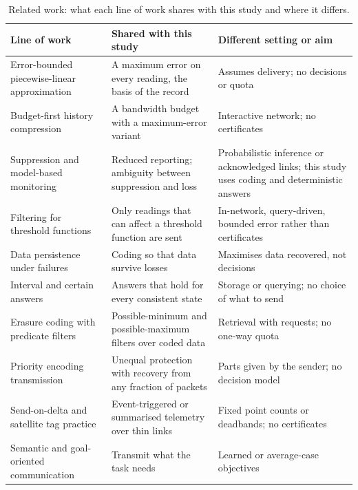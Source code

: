 \begin{table}[t]
\centering
\caption{Related work: what each line of work shares with this study and where it differs.}
\label{tab:novelty}
\scriptsize
\begin{tabularx}{\textwidth}{@{}>{\raggedright\arraybackslash}p{3.4cm}>{\raggedright\arraybackslash}X>{\raggedright\arraybackslash}X@{}}
\toprule
Line of work & Shared with this study & Different setting or aim \\
\midrule
Error-bounded piecewise-linear approximation \citep{imai1988,orourke1981,elmeleegy2009swing,lin2025} & A maximum error on every reading, the basis of the record & Assumes delivery; no decisions or quota \\
Budget-first history compression \citep{deligiannakis2007} & A bandwidth budget with a maximum-error variant & Interactive network; no certificates \\
Suppression and model-based monitoring \citep{silberstein2006conch,silberstein2007baysail,tulone2006paq,deshpande2004model} & Reduced reporting; ambiguity between suppression and loss & Probabilistic inference or acknowledged links; this study uses coding and deterministic answers \\
Filtering for threshold functions \citep{riva2014filtering} & Only readings that can affect a threshold function are sent & In-network, query-driven, bounded error rather than certificates \\
Data persistence under failures \citep{kamra2006growth} & Coding so that data survive losses & Maximises data recovered, not decisions \\
Interval and certain answers \citep{imielinski1984,cheng2003probabilistic,cheng2003managing,brito2017platodb,lin2019plato} & Answers that hold for every consistent state & Storage or querying; no choice of what to send \\
Erasure coding with predicate filters \citep{taurone2024treat} & Possible-minimum and possible-maximum filters over coded data & Retrieval with requests; no one-way quota \\
Priority encoding transmission \citep{albanese1996,boucheron2000pet} & Unequal protection with recovery from any fraction of packets & Parts given by the sender; no decision model \\
Send-on-delta and satellite tag practice \citep{diazcacho2017sod,boehme2009,photopoulou2015} & Event-triggered or summarised telemetry over thin links & Fixed point counts or deadbands; no certificates \\
Semantic and goal-oriented communication \citep{zhang2023semantic,yates2021} & Transmit what the task needs & Learned or average-case objectives \\
\bottomrule
\end{tabularx}
\end{table}
